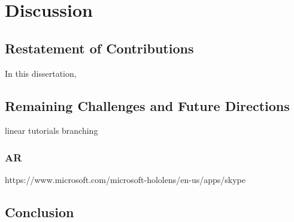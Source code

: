 \chapter{Discussion}
\label{chapter_conclusion}

\section{Restatement of Contributions}
In this dissertation,


\section{Remaining Challenges and Future Directions}
linear tutorials
branching

\subsection{AR}
https://www.microsoft.com/microsoft-hololens/en-us/apps/skype

\section{Conclusion}
